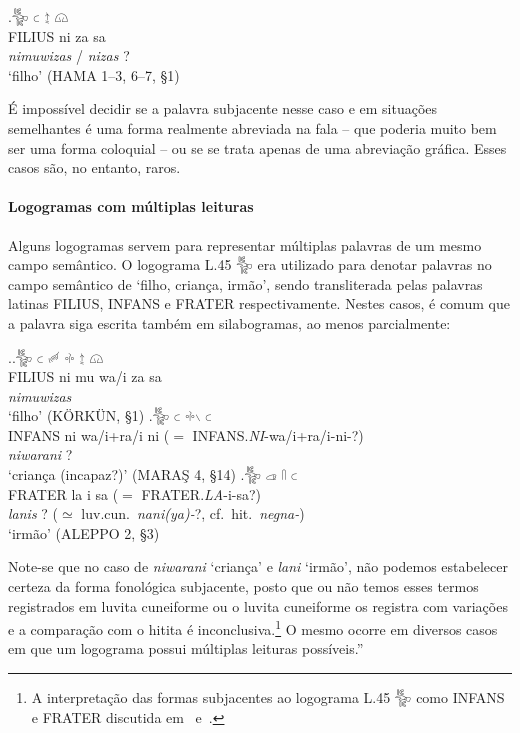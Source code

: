 \exg.\Large 𔐰 \Large 𔗐 \Large 𔖪 \Large 𔗔\\
FILIUS ni za sa\\
\emph{nimuwizas} \slash{} \emph{nizas}{ }?\\
`filho' (HAMA 1–3, 6–7, §1)

É impossível decidir se a palavra subjacente nesse caso e em situações
semelhantes é uma forma realmente abreviada na fala  -- que poderia muito bem ser
uma forma coloquial -- ou se se trata apenas de uma abreviação gráfica.
Esses casos são, no entanto, raros.

\paragraph{Logogramas com múltiplas leituras}
Alguns logogramas servem para representar múltiplas palavras de um mesmo campo
semântico.
O logograma L.45 𔐰 era utilizado para denotar palavras no campo semântico de
`filho, criança, irmão', sendo transliterada pelas palavras latinas FILIUS,
INFANS e FRATER respectivamente. Nestes casos, é comum que a palavra siga
escrita também em silabogramas, ao menos parcialmente:

\ex.\ag.\Large 𔐰 \Large 𔗐 \Large 𔑿 \Large 𔗬 \Large 𔖪 \Large 𔗔\\
FILIUS ni mu wa\slash{}i za sa\\
\emph{nimuwizas} \\
`filho' (KÖRKÜN, §1)
\bg.\Large 𔐰 \Large 𔗐 \Large 𔗬𔖱 \Large 𔗐\\
INFANS ni wa\slash{}i+ra\slash{}i ni ($=$ INFANS.\emph{NI}-wa/i+ra/i-ni-?)\\
\emph{niwarani}{ }? \\
`criança (incapaz?)' (MARAŞ 4, §14)
\bg.\Large 𔐰 \Large 𔓊 \Large 𔓯 \Large 𔗐\\
FRATER la i sa ($=$ FRATER.\emph{LA}-i-sa?)\\
\emph{lanis}{ }?  ($\simeq$ luv.cun.\ \emph{nani{(ya)}-}?, cf.\ hit.\ \emph{negna-})\\
`irmão' (ALEPPO 2, §3)


\noindent Note-se que no caso de \emph{niwarani} `criança' e \emph{lani} `irmão',
não podemos estabelecer certeza da forma fonológica subjacente, posto que ou não
temos esses termos registrados em luvita cuneiforme ou o luvita cuneiforme os
registra com variações e a comparação com o hitita
é inconclusiva.\footnote{A interpretação das formas subjacentes ao logograma
	L.45 𔐰 como INFANS e FRATER discutida em~\citet[143--6]{Hawkins1980}
	e~\citet[387]{Yakubovich2010b}.}
O mesmo ocorre em diversos casos em que um logograma possui múltiplas leituras
possíveis.''

